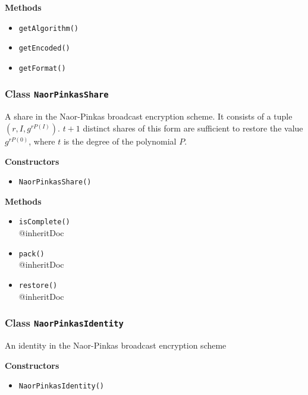 \textbf{Methods}
\begin{itemize}
\item \lstinline|getAlgorithm()| \\


\item \lstinline|getEncoded()| \\


\item \lstinline|getFormat()| \\


\end{itemize}

\subsubsection{Class \lstinline|NaorPinkasShare|}
A share in the Naor-Pinkas broadcast encryption scheme. It consists of a tuple
 $(r, I, g^{r P(I)})$. $t + 1$ distinct shares of this form are sufficient to restore the
 value $g^{r P(0)}$, where $t$ is the degree of the polynomial $P$.

\textbf{Constructors}
\begin{itemize}
\item \lstinline|NaorPinkasShare()| \\


\end{itemize}

\textbf{Methods}
\begin{itemize}
\item \lstinline|isComplete()| \\
{@inheritDoc}

\item \lstinline|pack()| \\
{@inheritDoc}

\item \lstinline|restore()| \\
{@inheritDoc}

\end{itemize}

\subsubsection{Class \lstinline|NaorPinkasIdentity|}
An identity in the Naor-Pinkas broadcast encryption scheme

\textbf{Constructors}
\begin{itemize}
\item \lstinline|NaorPinkasIdentity()| \\


\end{itemize}

